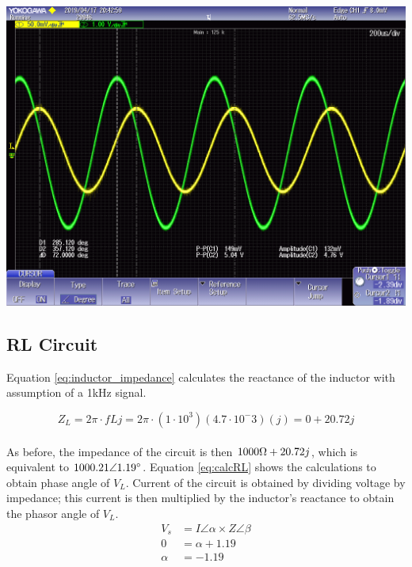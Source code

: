 \documentclass[journal]{IEEEtran}
\begin{document}
\begingroup
    \centering
    \medskip
    \includegraphics[width=\columnwidth]{images/lab8_005.png}
    \label{fig:rcosc2}
    \medskip
\endgroup


\subsection{RL Circuit}
\noindent Equation \ref{eq:inductor_impedance} calculates the reactance of the inductor with assumption of a 1kHz signal.

\begin{equation}
Z_{L} = 2\pi\cdot fLj = 2\pi \cdot (1\cdot10^3)(4.7\cdot10^-3)(j) = 0 + 20.72j
\label{eq:inductor_impedance}
\end{equation} \\

\noindent As before, the impedance of the circuit is then $1000\ohm + 20.72j$, which is equivalent to $1000.21 \angle1.19\degree$. Equation \ref{eq:calcRL} shows the calculations to obtain phase angle of ${V_L}$. Current of the circuit is obtained by dividing voltage by impedance; this current is then multiplied by the inductor's reactance to obtain the phasor angle of ${V_L}$. \\

\begin{equation}
    \begin{split}
        V_s & = I \angle \alpha \times Z \angle \beta \\
        0 & = \alpha + 1.19 \\
        \alpha & = -1.19
    \end{split}
    \label{eq:calcRL}
\end{equation} \\
\end{document}
